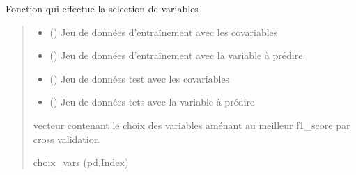 \documentclass[letterpaper,10pt,french]{sphinxmanual}
\begin{document}

\begin{fulllineitems}
\label{\detokenize{KNN_sel_var:KNN_sel_var.main}}
\pysigstartsignatures
{}
\pysigstopsignatures
\sphinxAtStartPar
Fonction qui effectue la selection de variables
\begin{quote}\begin{description}
\begin{itemize}
\item {} 
\sphinxAtStartPar
{} () \textendash{} Jeu de données d’entraînement avec les co\sphinxhyphen{}variables

\item {} 
\sphinxAtStartPar
{} () \textendash{} Jeu de données d’entraînement avec la variable à prédire

\item {} 
\sphinxAtStartPar
{} () \textendash{} Jeu de données test avec les co\sphinxhyphen{}variables

\item {} 
\sphinxAtStartPar
{} () \textendash{} Jeu de données tets avec la variable à prédire

\end{itemize}

\sphinxAtStartPar
vecteur contenant le choix des variables aménant au meilleur f1\_score par cross validation

\sphinxAtStartPar
choix\_vars (pd.Index)

\end{description}\end{quote}

\end{fulllineitems}

\end{document}
